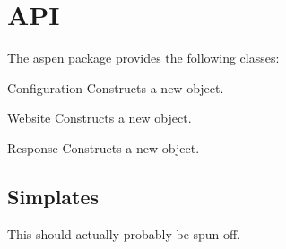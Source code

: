 \chapter{API \label{api}}

The aspen package provides the following classes:

\begin{classdesc}{Configuration}{}
Constructs a new  object.
\end{classdesc}

\begin{classdesc}{Website}{}
Constructs a new  object.
\end{classdesc}

\begin{classdesc}{Response}{}
Constructs a new  object.
\end{classdesc}

\section{Simplates \label{simplates}}

This should actually probably be spun off.
